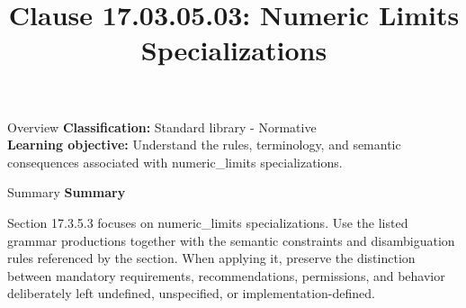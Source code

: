 \documentclass[10pt,letterpaper]{article}
\title{Clause 17.03.05.03: Numeric Limits Specializations}
\author{}
\date{}
\begin{document}
\maketitle
\begin{CornellOverviewBox}{Overview}
\textbf{Classification:} Standard library - Normative\\[2pt]
\textbf{Learning objective:} Understand the rules, terminology, and semantic consequences associated with numeric\_limits specializations.
\end{CornellOverviewBox}\begin{CornellSummaryBox}{Summary}
{\sffamily\bfseries\color{Accent} Summary}\par\vspace{3pt}Section 17.3.5.3 focuses on numeric\_limits specializations. Use the listed grammar productions together with the semantic constraints and disambiguation rules referenced by the section. When applying it, preserve the distinction between mandatory requirements, recommendations, permissions, and behavior deliberately left undefined, unspecified, or implementation-defined.
\end{CornellSummaryBox}
\end{document}
